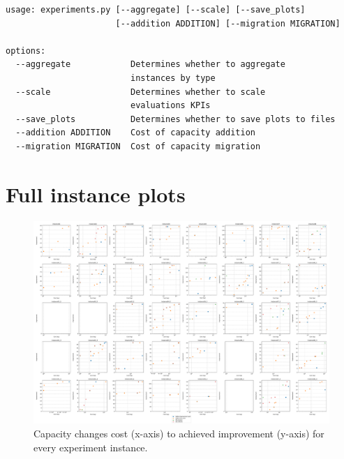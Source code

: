 \begin{small}
\begin{verbatim}
usage: experiments.py [--aggregate] [--scale] [--save_plots]
                      [--addition ADDITION] [--migration MIGRATION]
                                                                                                               
options:                                                                                                       
  --aggregate            Determines whether to aggregate
                         instances by type                                      
  --scale                Determines whether to scale
                         evaluations KPIs                                           
  --save_plots           Determines whether to save plots to files                                              
  --addition ADDITION    Cost of capacity addition                                                              
  --migration MIGRATION  Cost of capacity migration
\end{verbatim}
\end{small}

\section{Full instance plots} \label{sec:attachments/full-instance-plots}

\begin{figure}[p]
    \centering
    \includegraphics[angle=270, width=\textwidth]{img/exp_cost_improv.pdf}
    \caption{
        Capacity changes cost (x-axis) to achieved 
        improvement (y-axis) for every experiment instance.
        }
    \label{fig:exp-full/cost-improv}
\end{figure}

